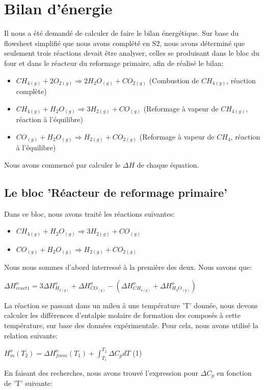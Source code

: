 \documentclass[11pt,a4paper]{report}
\author{Groupe 1246}
\begin{document}
\section*{Bilan d'énergie}
Il nous a été demandé de calculer de faire le bilan énergétique. Sur base du flowsheet simplifié que nous avons complété en S2, nous avons déterminé que seulement trois réactions devait être analyser, celles se produisant dans le bloc du four et dans le réacteur du reformage primaire, afin de réalisé le bilan:
\begin{itemize}
\item{$CH_{4(g)} + 2O_{2(g)} \Rightarrow 2H_{2}O_{(g)} + CO_{2(g)}$ (Combustion de $CH_{4(g)}$, réaction complète)}
\item{$CH_{4(g)} + H_{2}O_{(g)} \Rightarrow 3H_{2(g)} + CO_{(g)}$ (Reformage à vapeur de $CH_{4(g)}$, réaction à l'équilibre)}
\item{$CO_{(g)} + H_{2}O_{(g)} \Rightarrow H_{2(g)} + CO_{2(g)}$ (Reformage à vapeur de $CH_{4}$, réaction à l'équilibre)}
\end{itemize}

Nous avons commencé par calculer le $\Delta H$ de chaque équation.
\subsection*{Le bloc 'Réacteur de reformage primaire'}
Dans ce bloc, nous avons traité les réactions suivantes:
\begin{itemize}
\item{$CH_{4(g)} + H_{2}O_{(g)} \Rightarrow 3H_{2(g)} + CO_{(g)}$}
\item{$CO_{(g)} + H_{2}O_{(g)} \Rightarrow H_{2(g)} + CO_{2(g)}$}
\end{itemize}

Nous nous sommes d'abord interressé à la première des deux.
Nous savons que:

$\Delta H^o_{react1}=3\Delta H^o_{H_{2(g)}} + \Delta H^o_{CO_{(g)}} - (\Delta H^o_{CH_{4(g)}} + \Delta H^o_{H_{2}O_{(g)}})$

La réaction se passant dans un mileu à une température 'T' donnée, nous devons calculer les différences d'entalpie molaire de formation des composés à cette température, sur base des données expérimentale. Pour cela, nous avons utilisé la relation suivante:

$H^o_m(T_2)=\Delta H^o_{form}(T_1)+\int_{T_1}^{T_2} \Delta C_pdT$   (1)

En faisant des recherches, nous avons trouvé l'expression pour $\Delta C_p$ en fonction de 'T' suivante:
\end{document}
